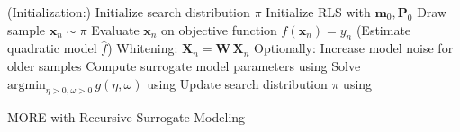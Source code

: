 \begin{algorithm}[H]
\renewcommand{\algorithmcfname}{Algorithm}
\DontPrintSemicolon
\SetAlgoLined
{}
\Begin(Initialization:)
{
  Initialize search distribution $\pi$ \;
  Initialize RLS with $\mathbf{m}_0, \mathbf{P}_0$ \;
}
{
  {
    Draw sample $\mathbf{x}_n \sim \pi$\;
    Evaluate $\mathbf{x}_n$ on objective function $f(\mathbf{x}_n) = y_n$\;
  }
  \Begin(Estimate quadratic model $\hat{f}$)
  {
    {
      Whitening: $\mathbf{X}_n = \mathbf{W} \, \mathbf{X}_n$\;
      Optionally: Increase model noise for older samples\;      
      Compute surrogate model parameters using  \;
    }
  }
  Solve  $\text{argmin}_{\eta >0, \omega > 0} \, g(\eta, \omega)$
  using  \;
  Update search distribution $\pi$ using \;
}
\caption{MORE with Recursive Surrogate-Modeling}
\label{alg:more}
\end{algorithm}

%
%
%
%
%
%